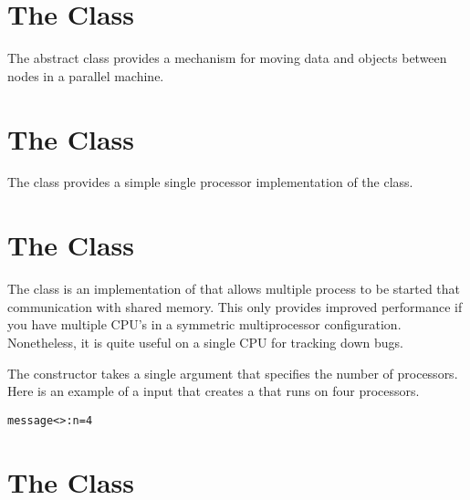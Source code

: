 

\section{The  Class}
\label{MessageGrp}

The  abstract class provides
a mechanism for moving data and objects between
nodes in a parallel machine.


\section{The  Class}
\label{ProcMessageGrp}

The  class provides
a simple single processor implementation of
the  class.


\section{The  Class}
\label{ShmMessageGrp}

The  class is an implementation of
 that allows multiple process to be
started that communication with shared memory.  This
only provides improved performance if you have multiple
CPU's in a symmetric multiprocessor configuration.  Nonetheless,
it is quite useful on a single CPU for tracking down bugs.

The   constructor takes
a single argument that specifies the number of processors.
Here is an example of a  input that
creates a  that runs on four processors.
\begin{alltt}
message<>: n = 4
\end{alltt}


\section{The  Class}
\label{MemoryGrp}
